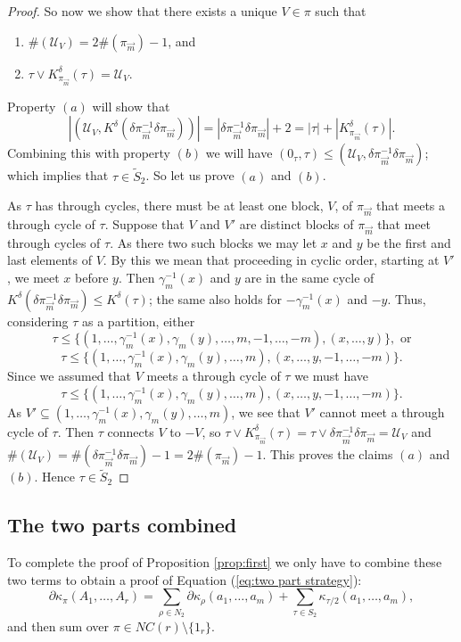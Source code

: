 \documentclass[11pt]{amsart}
\theoremstyle{definition}
\numberwithin{theorem}{section}
\newcommand{\cU}{\mathcal{U}}
\newcommand{\sV}{{\scriptscriptstyle V}}
\newcommand{\NC}{\mathit{NC}}
\newcommand{\vm}{{\vec{m}}}
\begin{document}
\begin{proof}
So now we show that there exists a unique $ V \in \pi$ such that
\begin{enumerate}
\item[$(a)$]
$\#(\cU_\sV) = 2 \#(\pi_\vm) - 1$, and

\item[$(b)$]
$\tau \vee K^\delta_{\pi_\vm}(\tau) = \cU_\sV$. 
\end{enumerate}
Property $(a)$ will show that 
\[
|(\cU_\sV, K^\delta(\delta\pi_\vm^{-1} \delta \pi_\vm))| = |\delta \pi_\vm^{-1}\delta \pi_\vm| + 2
= | \tau| + |K^\delta_{\pi_\vm}(\tau)|. 
\]
Combining this with property $(b)$ we will have $(0_\tau,
\tau) \leq (\cU_\sV, \delta \pi^{-1}_\vm \delta \pi_\vm)$;
which implies that $\tau \in \tilde{S}_2$. So let us prove
$(a)$ and $(b)$.

As $\tau$ has through cycles, there must be at least one
block, $V$, of $\pi_\vm$ that meets a through cycle of
$\tau$.  Suppose that $V$ and $V'$ are distinct blocks of
$\pi_\vm$ that meet through cycles of $\tau$. As there two
such blocks we may let $x$ and $y$ be the first and last
elements of $V$. By this we mean that proceeding in cyclic
order, starting at $V'$, we meet $x$ before $y$. Then
$\gamma_m^{-1}(x)$ and $y$ are in the same cycle of
$K^\delta(\delta\pi^{-1}_\vm\delta\pi_\vm) \leq
K^\delta(\tau)$; the same also holds for $-\gamma_m^{-1}(x)$
and $-y$. Thus, considering $\tau$ as a partition, either
\[
\tau \leq 
\{(1, \dots, \gamma_m^{-1}(x), \gamma_m(y), \dots, m, -1, \dots, -m),
(x, \dots, y)\}, \mbox{\ or}
\]
\[
\tau \leq
\{(1, \dots, \gamma_m^{-1}(x), \gamma_m(y), \dots, m), 
(x, \dots, y, -1, \dots, -m)\}.
\]
Since we assumed that $V$ meets a through cycle of $\tau$ we must have 
\[
\tau \leq
\{(1, \dots, \gamma_m^{-1}(x), \gamma_m(y), \dots, m), 
(x, \dots, y, -1, \dots, -m)\}.
\]
As $V' \subseteq (1, \dots, \gamma_m^{-1}(x), \gamma_m(y),
\dots, m)$, we see that $V'$ cannot meet a through cycle of
$\tau$.  Then $\tau$ connects $V$ to $-V$, so $\tau \vee
K^\delta_{\pi_\vm}(\tau) = \tau \vee \delta\pi_\vm^{-1}
\delta \pi_\vm = \cU_\sV$ and $\#(\cU_\sV) = \#(\delta
\pi_\vm^{-1} \delta \pi_\vm) -1 = 2\#(\pi_\vm) -1 $. This
proves the claims $(a)$ and $(b)$. Hence $\tau \in \tilde
S_2$
\end{proof}

\subsection{\normalsize The two parts combined}

To complete the proof of Proposition \ref{prop:first} we
only have to combine these two terms to obtain a proof of
Equation (\ref{eq:two part strategy}):
\[
\partial\kappa_\pi(A_1, \dots, A_r)
=
\sum_{\rho \in N_2}
\partial \kappa_\rho(a_1, \dots, a_m) 
+
\sum_{\tau \in S_2}
\kappa_{\tau/2}(a_1, \dots, a_m),
\]
and then sum over $\pi \in \NC(r) \setminus \{1_r\}$. 
\end{document}
